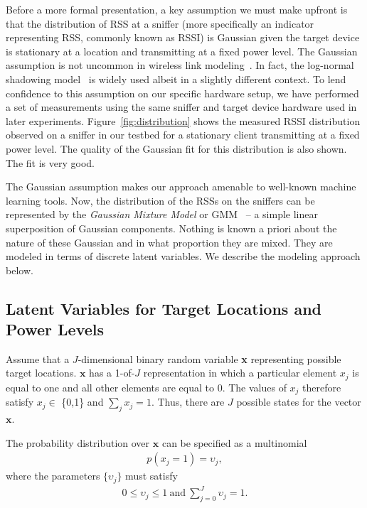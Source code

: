 Before a more formal presentation, a key assumption we must make upfront
is that the distribution of RSS at a sniffer (more specifically an indicator representing RSS, commonly known as RSSI) is Gaussian
given the target device is stationary at a location and transmitting at
a fixed power level. The Gaussian assumption is not uncommon in wireless link modeling~\cite{Haeberlen:2004:PRL:1023720.1023728, Moraes:2006:CWL:1164783.1164799, Tao:2003:WLL:941311.941314}. In fact, the log-normal shadowing model~\cite{Rappaport:2001:WCP:559977} is widely used albeit in a slightly different context. To lend confidence to this assumption on our specific hardware setup, we have performed a set of measurements using the same sniffer and target device hardware used in later experiments. 
Figure~\ref{fig:distribution} shows the measured
RSSI distribution observed on a sniffer in our testbed 
for a stationary client transmitting at a fixed power level. The quality of the Gaussian fit for this distribution is also shown. The fit is very good. 

The Gaussian assumption makes our approach amenable to well-known machine learning tools. Now,
the distribution of the RSSs on the sniffers can be represented by the \emph{Gaussian Mixture Model} or GMM~\cite{Reynolds, Bishop:2006:PRM:1162264} --  a simple linear superposition of Gaussian components. 
Nothing is known a priori about the nature of these Gaussian
and in what proportion they are mixed. They are modeled in terms of discrete latent variables. We describe the modeling approach below.  

\subsection{Latent Variables for Target Locations and Power Levels}
\label{subsec:latentvariablesfortargetlocationsandpowerlevels}

Assume that a $J$-dimensional binary random variable {\bf x} representing possible target locations. $\mathbf{x}$ has a 1-of-$J$ representation in which a particular element $x_{j}$ is equal to one and all other elements are equal to $0$. The values of $x_{j}$ therefore satisfy $x_{j} \in$ \{0,1\} and $\sum_{j} x_{j} = 1$. Thus, there are $J$ possible states for the vector $\mathbf{x}$.

The probability distribution over $\mathbf{x}$ can be specified as a multinomial 
\begin{align}
 p(x_{j} = 1) = \upsilon_{j},
\end{align}
where the parameters $\{\upsilon_{j}\}$ must satisfy
\begin{align}
0 \le \upsilon_{j} \le 1 \ \text{and} \ \sum_{j=0}^{J} \upsilon_{j} = 1.
\end{align}

